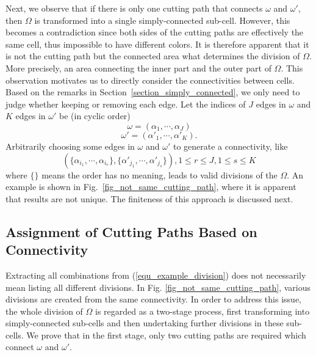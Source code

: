 \documentclass[conference]{IEEEtran}
\begin{document}
Next, we observe that if there is only one cutting path that connects $\omega$ and $\omega'$, then $\Omega$ is transformed into a 
single simply-connected sub-cell. However, this becomes a contradiction since both sides of the cutting paths are effectively the same cell, 
thus impossible to have different colors. It is therefore apparent that it is not the cutting path but the connected area what determines 
the division of $\Omega$. More precisely, an area connecting the inner part and the outer part of $\Omega$. 
This observation motivates us to directly consider the connectivities between cells. Based on the remarks in 
Section~\ref{section_simply_connected}, we only need to judge whether keeping or removing each edge. 
Let the indices of $J$ edges in $\omega$ and $K$ edges in $\omega'$ be (in cyclic order) 
\begin{equation}\label{equ_omega}
\omega = (\alpha_1, \cdots, \alpha_J)
\end{equation}
\begin{equation}\label{equ_omega_prime}
\omega' = (\alpha'_1, \cdots, \alpha'_K).
\end{equation}
Arbitrarily choosing some edges in $\omega$ and $\omega'$ to generate a connectivity, like
\begin{equation}\label{equ_example_division}
(\{\alpha_{i_1}, \cdots, \alpha_{i_r}\}, \{\alpha'_{j_1}, \cdots, \alpha'_{j_s}\} ), 1\leq r\leq J, 1\leq s\leq K
\end{equation}
where $\{\}$ means the order has no meaning, leads to valid divisions of the $\Omega$. An example is shown in 
Fig.~\ref{fig_not_same_cutting_path}, where it is apparent that results are not unique. The finiteness of this approach is discussed next. 


\subsection{Assignment of Cutting Paths Based on Connectivity}
\label{subsection_arbitrary_assignment}
Extracting all combinations from (\ref{equ_example_division}) does not necessarily mean listing all different divisions. 
In Fig. \ref{fig_not_same_cutting_path}, various divisions are created from the same connectivity. 
In order to address this issue, the whole division of $\Omega$ is regarded as a two-stage process, first transforming into simply-connected sub-cells and then undertaking further divisions in these sub-cells. 
We prove that in the first stage, only two cutting paths are required which connect $\omega$ and $\omega'$. 
\end{document}
